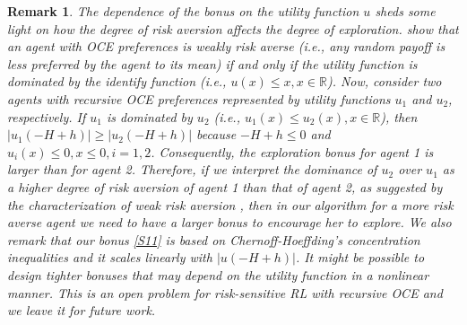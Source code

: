 \documentclass[11pt]{article}
\newtheorem{remark}{Remark}
\newcommand{\1}{\mathbbm{1}}
\begin{document}
\begin{remark}
The dependence of the bonus on the utility function $u$ sheds some light on how the degree of risk aversion affects the degree of exploration. 
\citet{ben2007old} show that an agent with OCE preferences is weakly risk averse (i.e., any random payoff is less preferred by the agent to its mean) if and only if the utility function is dominated by the identify function (i.e., $u(x)\le x,x\in \mathbb{R}$). Now, consider two agents with recursive OCE preferences represented by utility functions $u_1$ and $u_2$, respectively. If $u_1$ is dominated by $u_2$ (i.e., $u_1(x)\le u_2(x),x\in\mathbb{R}$), then $|u_1(-H+h)|\ge |u_2(-H+h)|$ because $-H+h\le 0$ and $u_i(x)\le 0,x\le 0,i=1,2$. Consequently, the exploration bonus for agent 1 is larger than for agent 2. Therefore, if we interpret the dominance of $u_2$ over $u_1$ as a higher degree of risk aversion of agent 1 than that of agent 2, as suggested by the characterization of weak risk aversion \citep{ben2007old}, then in our algorithm for a more risk averse agent we need to have a larger bonus to encourage her to explore. 
We also remark that 
our bonus \eqref{S11} is based on Chernoff-Hoeffding’s concentration inequalities and it scales linearly with $|u(-H+h)|$.  It might be possible to design tighter bonuses that may depend on the utility function in a nonlinear manner. This is an open problem for risk-sensitive RL with recursive OCE and we leave it for future work.
\end{remark}
\end{document}
